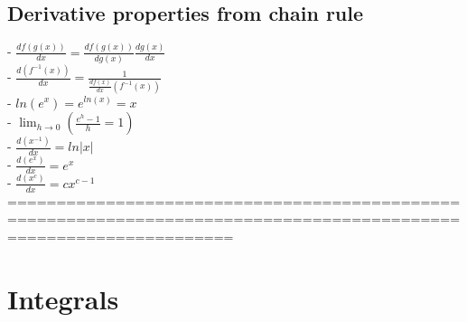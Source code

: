 \documentclass{book}
\begin{document}
\subsection{Derivative properties from chain rule} %
	- $\frac{df(g(x))}{dx} = \frac{df(g(x))}{dg(x)} \frac{dg(x)}{dx}$ \\ %
	- $\frac{d(f^{-1}(x))}{dx} = \frac{1}{\frac{df(x)}{dx}(f^{-1}(x))}$ \\
	- $ln(e^x) = e^{ln(x)} = x$ \\
	- $\lim_{h \to 0} (\frac{e^h - 1}{h} = 1)$ \\
	- $\frac{d(x^{-1})}{dx} = ln|x|$ \\ %
	- $\frac{d(e^x)}{dx} = e^x$ \\
	- $\frac{d(x^c)}{dx} = c x^{c-1}$ \\
	===================================================================================================================
\section{Integrals}
\end{document}
